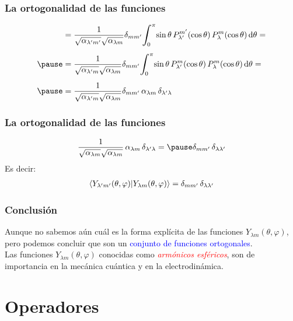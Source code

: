 \documentclass[12pt]{beamer}
\begin{document}
\begin{frame}
\frametitle{La ortogonalidad de las funciones}
\begin{eqnarray*}
\begin{aligned}
&= \dfrac{1}{\sqrt{\alpha_{\lambda^{\prime} m^{\prime}}}  \sqrt{\alpha_{\lambda m}}} \delta_{m m^{\prime}}
\scaleint{6ex}_{\bs 0}^{\pi} \! \sin \theta \, P_{\lambda^{\prime}}^{m^{\prime}} (\cos \theta) \, P_{\lambda}^{m} (\cos \theta) \dd{\theta} = \\[0.5em] \pause
&= \dfrac{1}{\sqrt{\alpha_{\lambda^{\prime} m}}  \sqrt{\alpha_{\lambda m}}} \delta_{m m^{\prime}}
\scaleint{6ex}_{\bs 0}^{\pi} \! \sin \theta \, P_{\lambda^{\prime}}^{m} (\cos \theta) \, P_{\lambda}^{m} (\cos \theta) \dd{\theta} = \\[0.5em] \pause
&= \dfrac{1}{\sqrt{\alpha_{\lambda^{\prime} m}}  \sqrt{\alpha_{\lambda m}}} \delta_{m m^{\prime}} \, \alpha_{\lambda m} \, \delta_{\lambda^{\prime} \lambda}
\end{aligned}
\end{eqnarray*}
\end{frame}
\begin{frame}
\frametitle{La ortogonalidad de las funciones}
\begin{eqnarray*}
\begin{aligned}    
\dfrac{1}{\sqrt{\alpha_{\lambda m}}  \sqrt{\alpha_{\lambda m}}} \, \alpha_{\lambda m} \, \delta_{\lambda^{\prime} \lambda} = \pause \delta_{m m^{\prime}} \, \delta_{\lambda \lambda^{\prime}}
\end{aligned}
\end{eqnarray*}
\pause
Es decir:
\begin{align}
\braket{Y_{\lambda^{\prime} m^{\prime}} (\theta, \varphi)}{Y_{\lambda m} (\theta, \varphi)} = \delta_{m m^{\prime}} \, \delta_{\lambda \lambda^{\prime}}
\end{align}
\end{frame}
\begin{frame}
\frametitle{Conclusión}
Aunque no sabemos aún cuál es la forma explícita de las funciones $Y_{\lambda m} (\theta, \varphi)$, pero podemos concluir que son un \textcolor{blue}{conjunto de funciones ortogonales}.
\\
\bigskip
\pause
Las funciones $Y_{\lambda m} (\theta, \varphi)$ conocidas como \textcolor{red}{\emph{armónicos esféricos}}, son de importancia en la mecánica cuántica y en la electrodinámica.
\end{frame}

\section{Operadores}
\end{document}
